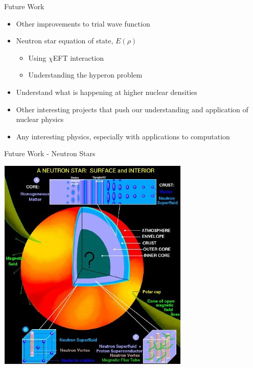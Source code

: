 \documentclass{beamer}
\begin{document}
\begin{frame}{Future Work}
\begin{itemize}
   \item Other improvements to trial wave function
   \item Neutron star equation of state, $E(\rho)$
   \begin{itemize}
      \item Using $\chi$EFT interaction
      \item Understanding the hyperon problem
   \end{itemize}
   \item Understand what is happening at higher nuclear densities
   \item Other interesting projects that push our understanding and application of nuclear physics
   \item Any interesting physics, especially with applications to computation
\end{itemize}
\end{frame}

\begin{frame}{Future Work - Neutron Stars}
\begin{center}
   \includegraphics[height=0.7\textwidth]{figures/neutron_star.jpg}
\end{center}
\end{frame}
\end{document}
